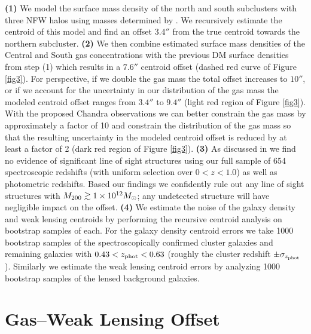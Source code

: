 \textbf{(1)} We model the surface mass density of the north and south subclusters with three NFW halos using masses determined by \citet{Dawson:2012dl}. We recursively estimate the centroid of this model and find an offset $3.4''$ from the true centroid towards the northern subcluster. 
\textbf{(2)} We then combine estimated surface mass densities of the
Central and South gas concentrations with the previous DM surface
densities from step (1) which results in a $7.6''$ centroid offset (dashed red curve of Figure \ref{fig3}).  
For perspective, if we double the gas mass the total offset increases to $10''$, or if we account for the uncertainty in our distribution of the gas mass the modeled centroid offset ranges from $3.4''$ to $9.4''$ (light red region of Figure \ref{fig3}). 
With the proposed Chandra observations we can better constrain the gas mass by approximately a factor of 10 and constrain the distribution of the gas mass so that the resulting uncertainty in the modeled centroid offset is reduced by at least a factor of 2 (dark red region of Figure \ref{fig3}).
\textbf{(3)} As discussed in \citet{Dawson:2012dl} we find no evidence of significant line of sight structures using our full sample of 654 spectroscopic redshifts (with uniform selection over $0<z<1.0$) as well as photometric redshifts. 
Based our findings we confidently rule out any line of sight structures with $M_{\rm 200}\gtrsim1\times10^{12} M_\odot$; any undetected structure will have negligible impact on the offset.
\textbf{(4)} We estimate the noise of the galaxy density and weak lensing centroids by performing the recursive centroid analysis on bootstrap samples of each.
For the galaxy density centroid errors we take 1000 bootstrap samples of the spectroscopically confirmed cluster galaxies and remaining galaxies with $0.43<z_{\rm phot}<0.63$ (roughly the cluster redshift $\pm\sigma_{z_{\rm phot}}$).
Similarly we estimate the weak lensing centroid errors by analyzing 1000 bootstrap samples of the lensed background galaxies.

\section{Gas--Weak Lensing Offset}\label{section:GasWLOffset}

